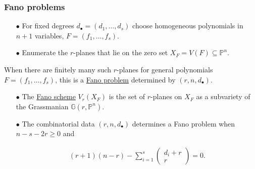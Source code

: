 \documentclass{beamer}
\theoremstyle{definition}
\newcommand{\blue}[1]{{\color{black!15!blue}\underline{#1}}}
\begin{document}
\begin{frame}
\frametitle{Fano problems}
\begin{enumerate}
\item[$\bullet$] For fixed degrees $d_\bullet = (d_1,\dotsc,d_s)$ choose homogeneous polynomials in $n+1$ variables, $F = (f_1,\dotsc,f_s)$.

\item[$\bullet$] Enumerate the $r$-planes that lie on the zero set $X_F = V(F)\subseteq\mathbb{P}^n$.
\end{enumerate}

When there are finitely many such $r$-planes for general polynomials $F = (f_1,\dotsc,f_s)$, this is a \blue{Fano problem} determined by $(r,n,d_\bullet)$.

\begin{enumerate}
\pause

\item[$\bullet$] The \blue{Fano scheme} $V_r(X_F)$ is the set of $r$-planes on $X_F$ as a subvariety of the Grassmanian $\mathbb{G}(r,\mathbb{P}^n)$.

\pause

\item[$\bullet$] The combinatorial data $(r,n,d_\bullet)$ determines a Fano problem when $n-s-2r\ge 0$ and

\vspace{-.8cm}

\begin{align*}
(r+1)(n-r) - \sum_{i=1}^s \left(\begin{smallmatrix}d_i + r\\r\end{smallmatrix}\right)=0.
\end{align*}
\end{enumerate}

\end{frame}
\end{document}
